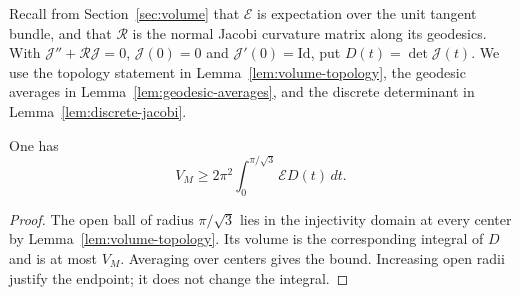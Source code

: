 Recall from Section~\ref{sec:volume} that $\mathcal E$ is expectation over
the unit tangent bundle, and that $\mathcal R$ is the normal Jacobi
curvature matrix along its geodesics. With
$\mathcal J''+\mathcal R\mathcal J=0$, $\mathcal J(0)=0$ and
$\mathcal J'(0)=\mathrm{Id}$, put $D(t)=\det\mathcal J(t)$.
We use the topology statement in Lemma~\ref{lem:volume-topology}, the
geodesic averages in Lemma~\ref{lem:geodesic-averages}, and the discrete
determinant in Lemma~\ref{lem:discrete-jacobi}.

\begin{lemma}\label{lem:lower-polar}
One has
\[
 V_M\ge2\pi^2\int_0^{\pi/\sqrt3}\mathcal E D(t)\,dt.
\]
\end{lemma}
\begin{proof}
The open ball of radius $\pi/\sqrt3$ lies in the injectivity domain at
every center by Lemma~\ref{lem:volume-topology}. Its volume is the
corresponding integral of $D$ and is at most $V_M$. Averaging over centers
gives the bound. Increasing open radii justify the endpoint; it does not
change the integral.
\end{proof}

